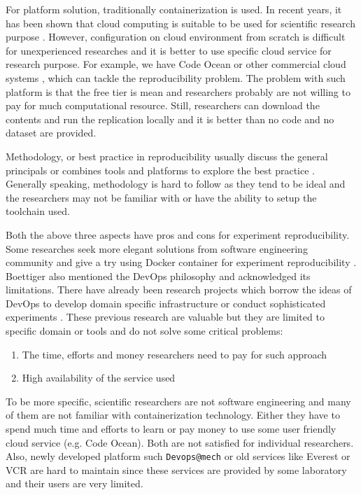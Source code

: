 \documentclass{IEEEcsmag}
\begin{document}
For platform solution, traditionally containerization is used. In recent years, it has been shown that cloud computing is suitable to be used for scientific research purpose \cite{Howe12}. However, configuration on cloud environment from scratch is difficult for unexperienced researches and it is better to use specific cloud service for research purpose. For example, we have Code Ocean or other commercial cloud systems \cite{perkel2018data}, which can tackle the reproducibility problem. The problem with such platform is that the free tier is mean and researchers probably are not willing to pay for much computational resource. Still, researchers can download the contents and run the replication locally and it is better than no code and no dataset are provided.

Methodology, or best practice in reproducibility usually discuss the general principals \cite{stodden2014best} or combines tools and platforms to explore the best practice \cite{QashaCW16}. Generally speaking, methodology is hard to follow as they tend to be ideal and the researchers may not be familiar with or have the ability to setup the toolchain used.  

Both the above three aspects have pros and cons for experiment reproducibility. Some researches seek more elegant solutions from software engineering community and give a try using Docker container for experiment reproducibility \cite{Boettiger15}.
Boettiger also mentioned the DevOps philosophy and acknowledged its limitations.
There have already been research projects which borrow the ideas of DevOps to develop domain specific infrastructure \cite{philips2019devops} or conduct sophisticated experiments \cite{chwalisz2019walker}. These previous research are valuable but they are limited to specific domain or tools and do not solve some critical problems:
\begin{enumerate}
\item The time, efforts and money researchers need to pay for such approach
\item High availability of the service used
\end{enumerate}

To be more specific, scientific researchers are not software engineering and many of them are not familiar with containerization technology. Either they have to spend much time and efforts to learn or pay money to use some user friendly 
cloud service (e.g. Code Ocean). Both are not satisfied for individual researchers. Also, newly developed platform such \texttt{Devops@mech} \cite{philips2019devops} or old services like Everest \cite{VOLKOV2017112} or VCR \cite{GavishD12} are hard to maintain since these services are provided by some laboratory and their users are very limited.
\end{document}
